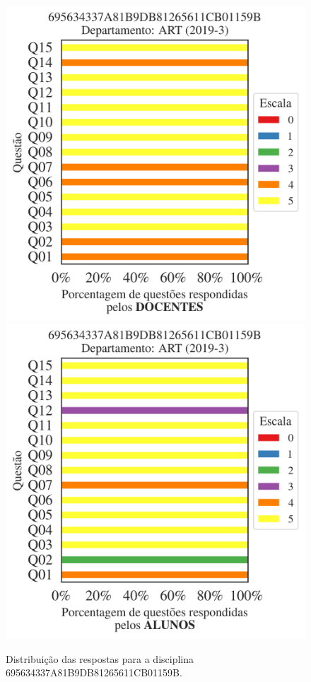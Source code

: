 \documentclass[a4paper,10pt]{article}
\begin{document}
\begin{figure}[h]
\centering
\includegraphics[width=0.485\linewidth]{analise_disciplina_departamento_ART_695634337A81B9DB81265611CB01159B_docentes.png}
\includegraphics[width=0.485\linewidth]{analise_disciplina_departamento_ART_695634337A81B9DB81265611CB01159B_alunos.png}
\caption{\label{fig:analise_geral_departamento}                Distribuição das respostas para a disciplina 695634337A81B9DB81265611CB01159B. }
\end{figure}
\end{document}
